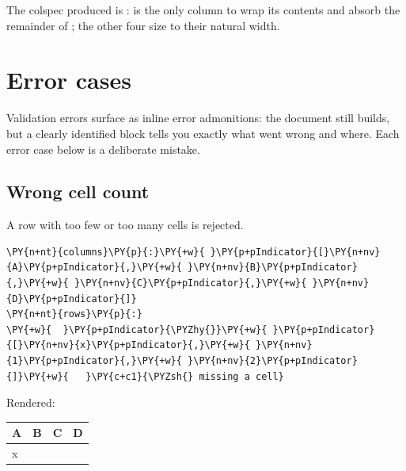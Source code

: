 \documentclass[a4paper,twoside]{article}
\begin{document}
The colspec produced is :  is the only column to wrap
its contents and absorb the remainder of ; the other four size
to their natural width.
\section{Error cases}
Validation errors surface as inline error admonitions: the document still
builds, but a clearly identified block tells you exactly what went wrong and
where. Each error case below is a deliberate mistake.
\subsection{Wrong cell count}
A row with too few or too many cells is rejected.
\begin{tscode}[lang=yaml, engine=pygments]
\begin{Verbatim}[commandchars=\\\{\},breaklines, breakanywhere, commandchars=\\\{\}]
\PY{n+nt}{columns}\PY{p}{:}\PY{+w}{ }\PY{p+pIndicator}{[}\PY{n+nv}{A}\PY{p+pIndicator}{,}\PY{+w}{ }\PY{n+nv}{B}\PY{p+pIndicator}{,}\PY{+w}{ }\PY{n+nv}{C}\PY{p+pIndicator}{,}\PY{+w}{ }\PY{n+nv}{D}\PY{p+pIndicator}{]}
\PY{n+nt}{rows}\PY{p}{:}
\PY{+w}{  }\PY{p+pIndicator}{\PYZhy{}}\PY{+w}{ }\PY{p+pIndicator}{[}\PY{n+nv}{x}\PY{p+pIndicator}{,}\PY{+w}{ }\PY{n+nv}{1}\PY{p+pIndicator}{,}\PY{+w}{ }\PY{n+nv}{2}\PY{p+pIndicator}{]}\PY{+w}{   }\PY{c+c1}{\PYZsh{} missing a cell}
\end{Verbatim}
\end{tscode}
Rendered:
\begin{center}
\begin{tabularx}{\linewidth}{>{\raggedright\arraybackslash}X>{\raggedright\arraybackslash}X>{\raggedright\arraybackslash}X>{\raggedright\arraybackslash}X}
\toprule
\textbf{A} & \textbf{B} & \textbf{C} & \textbf{D} \\
\midrule
x & 1 & 2 &  \\
\bottomrule
\end{tabularx}
\end{center}
\end{document}
